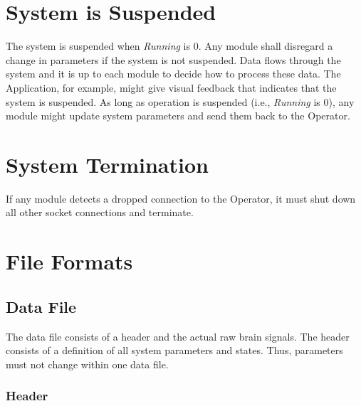 \documentclass[letterpaper,oneside,12pt]{book}
\begin{document}
\section{System is Suspended}
\label{sec:system_suspended}

The system is suspended when \textit{Running} is 0. Any module shall disregard a 
change in parameters if the system is not suspended. Data flows through the 
system and it is up to each module to decide how to process these data. The 
Application, for example, might give visual feedback that indicates that the 
system is suspended. As long as operation is suspended (i.e., \textit{Running} 
is 0), any module might update system parameters and send them back to the 
Operator.


\section{System Termination}
\label{system_termination}

If any module detects a dropped connection to the Operator, it must shut down 
all other socket connections and terminate.

\section{File Formats}

\subsection{Data File}

The data file consists of a header and the actual raw brain signals. The header 
consists of a definition of all system parameters and states. Thus, parameters 
must not change within one data file.

\subsubsection{Header}
\end{document}
